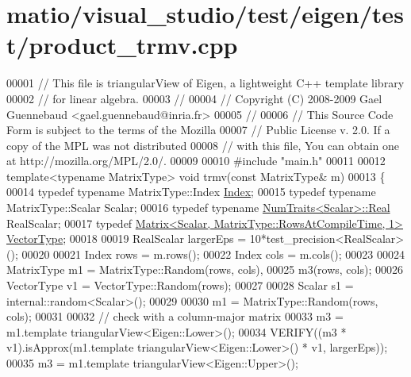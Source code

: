 \hypertarget{matio_2visual__studio_2test_2eigen_2test_2product__trmv_8cpp_source}{}\section{matio/visual\+\_\+studio/test/eigen/test/product\+\_\+trmv.cpp}
\label{matio_2visual__studio_2test_2eigen_2test_2product__trmv_8cpp_source}

\begin{DoxyCode}
00001 \textcolor{comment}{// This file is triangularView of Eigen, a lightweight C++ template library}
00002 \textcolor{comment}{// for linear algebra.}
00003 \textcolor{comment}{//}
00004 \textcolor{comment}{// Copyright (C) 2008-2009 Gael Guennebaud <gael.guennebaud@inria.fr>}
00005 \textcolor{comment}{//}
00006 \textcolor{comment}{// This Source Code Form is subject to the terms of the Mozilla}
00007 \textcolor{comment}{// Public License v. 2.0. If a copy of the MPL was not distributed}
00008 \textcolor{comment}{// with this file, You can obtain one at http://mozilla.org/MPL/2.0/.}
00009 
00010 \textcolor{preprocessor}{#include "main.h"}
00011 
00012 \textcolor{keyword}{template}<\textcolor{keyword}{typename} MatrixType> \textcolor{keywordtype}{void} trmv(\textcolor{keyword}{const} MatrixType& m)
00013 \{
00014   \textcolor{keyword}{typedef} \textcolor{keyword}{typename} MatrixType::Index \hyperlink{namespace_eigen_a62e77e0933482dafde8fe197d9a2cfde}{Index};
00015   \textcolor{keyword}{typedef} \textcolor{keyword}{typename} MatrixType::Scalar Scalar;
00016   \textcolor{keyword}{typedef} \textcolor{keyword}{typename} \hyperlink{group___core___module_struct_eigen_1_1_num_traits}{NumTraits<Scalar>::Real} RealScalar;
00017   \textcolor{keyword}{typedef} \hyperlink{group___core___module_class_eigen_1_1_matrix}{Matrix<Scalar, MatrixType::RowsAtCompileTime, 1>} 
      \hyperlink{struct_vector_type}{VectorType};
00018 
00019   RealScalar largerEps = 10*test\_precision<RealScalar>();
00020 
00021   Index rows = m.rows();
00022   Index cols = m.cols();
00023 
00024   MatrixType m1 = MatrixType::Random(rows, cols),
00025              m3(rows, cols);
00026   VectorType v1 = VectorType::Random(rows);
00027 
00028   Scalar s1 = internal::random<Scalar>();
00029 
00030   m1 = MatrixType::Random(rows, cols);
00031 
00032   \textcolor{comment}{// check with a column-major matrix}
00033   m3 = m1.template triangularView<Eigen::Lower>();
00034   VERIFY((m3 * v1).isApprox(m1.template triangularView<Eigen::Lower>() * v1, largerEps));
00035   m3 = m1.template triangularView<Eigen::Upper>();

\end{DoxyCode}
